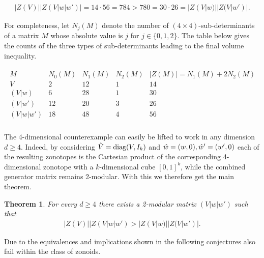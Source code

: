 \documentclass{article}
\theoremstyle{theorem}
\newtheorem{theorem}{Theorem}[section]
\theoremstyle{remark}
\begin{document}
\begin{align*}
    |Z(V)||Z({V}|w|w')| = 14 \cdot 56 = 784 > 780 = 30 \cdot 26 = |Z({V}|w)||Z({V}|w')|.
\end{align*}

For completeness, let $N_j(M)$ denote the number of $(4 \times 4)$-sub-determinants of a matrix $M$ whose absolute value is $j$ for $j \in \{0,1,2\}$. The table below gives the counts of the three types of sub-determinants leading to the final volume inequality.

\begin{align*}
    \begin{array}{c|ccc|c}
    M
    & N_0(M)
    & N_1(M)
    & N_2(M)
    & |Z(M)|=N_1(M)+2N_2(M)
    \\ \hline
    V
    & 2  & 12 & 1 & 14
    \\
    (V|w)
    & 6  & 28 & 1 & 30
    \\
    (V|w')
    & 12 & 20 & 3 & 26
    \\
    (V|w| w')
    & 18 & 48 & 4 & 56
    \end{array}
\end{align*}
\\

The 4-dimensional counterexample can easily be lifted to work in any dimension $d \geq 4$. Indeed, by considering $\Hat{V}=\text{diag}(V,I_k)$ and $\Hat{w}=(w,0),\Hat{w}' =(w',0)$ each of the resulting zonotopes is the Cartesian product of the corresponding 4-dimensional zonotope with a $k$-dimensional cube $[0,1]^k$, while the combined generator matrix remains 2-modular. With this we therefore get the main theorem.

\begin{theorem} \label{thm:main_thm}
    For every $d \geq 4$ there exists a 2-modular matrix $(V|w|w')$ such that 
    \begin{align*}
        |Z(V)||Z({V}|w|w') > |Z({V}|w)||Z({V}|w')|.
    \end{align*}
\end{theorem}


Due to the equivalences and implications shown in \citet[Theorem 3.6, 3.9, and 5.3]{fradelizi2024volume} the following conjectures also fail within the class of zonoids.
\end{document}
